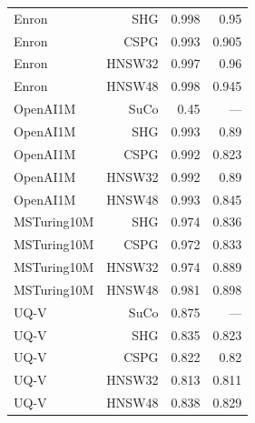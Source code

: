 \begin{table}[t]
\begin{tabular}{lrrr}
Enron & SHG & 0.998 & 0.95 \\
Enron & CSPG & 0.993 & 0.905 \\
Enron & HNSW32 & 0.997 & 0.96 \\
Enron & HNSW48 & 0.998 & 0.945 \\
OpenAI1M & SuCo & 0.45 & — \\
OpenAI1M & SHG & 0.993 & 0.89 \\
OpenAI1M & CSPG & 0.992 & 0.823 \\
OpenAI1M & HNSW32 & 0.992 & 0.89 \\
OpenAI1M & HNSW48 & 0.993 & 0.845 \\
MSTuring10M & SHG & 0.974 & 0.836 \\
MSTuring10M & CSPG & 0.972 & 0.833 \\
MSTuring10M & HNSW32 & 0.974 & 0.889 \\
MSTuring10M & HNSW48 & 0.981 & 0.898 \\
UQ-V & SuCo & 0.875 & — \\
UQ-V & SHG & 0.835 & 0.823 \\
UQ-V & CSPG & 0.822 & 0.82 \\
UQ-V & HNSW32 & 0.813 & 0.811 \\
UQ-V & HNSW48 & 0.838 & 0.829 \\
\bottomrule
\end{tabular}
\end{table}
